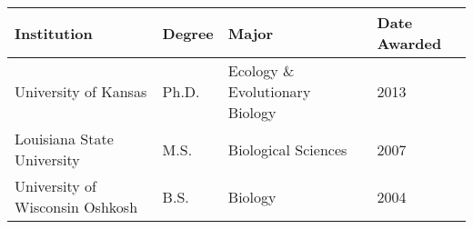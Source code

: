 \noindent\begin{tabulary}{\textwidth}{ @{} l l l l @{} }
    \textbf{Institution} & \textbf{Degree} & \textbf{Major} & \textbf{Date Awarded} \\
    \hline
    University of Kansas & Ph.D. & Ecology \& Evolutionary Biology & 2013 \\
    Louisiana State University & M.S. & Biological Sciences & 2007 \\
    University of Wisconsin Oshkosh & B.S. & Biology & 2004 \\
\end{tabulary}

